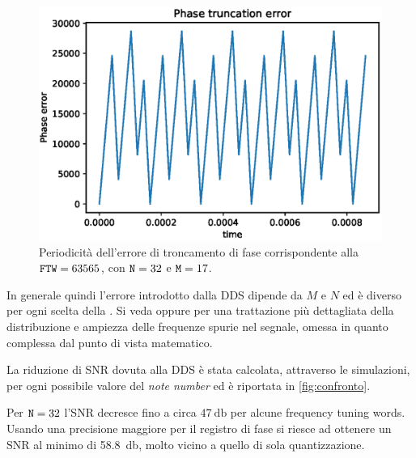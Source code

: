 \begin{figure}[H]
	\centering
	\includegraphics[width=0.85\columnwidth]{TeX_files/phase_truncation_error.eps}
	\caption{Periodicità dell'errore di troncamento di fase corrispondente alla $\texttt{FTW}=63565$, con $\texttt{N}=32$ e $\texttt{M}=17$.}
\end{figure}

In generale quindi l'errore introdotto dalla DDS dipende da $M$ e $N$ ed è diverso per ogni
scelta della . Si veda \cite{} oppure \cite{} per una trattazione
più dettagliata della distribuzione e ampiezza delle frequenze spurie nel segnale,
omessa in quanto complessa dal punto di vista matematico.

La riduzione di SNR dovuta alla DDS è stata calcolata, attraverso le simulazioni,
per ogni possibile valore del \textit{note number} ed è riportata in \cref{fig:confronto}.

Per $\texttt{N}=32$ l'SNR decresce fino a circa $\SI{47}{\decibel}$ per alcune
frequency tuning words. Usando una precisione maggiore per il registro di fase
si riesce ad ottenere un SNR al minimo di \SI{58.8}{\decibel}, molto vicino a quello di sola quantizzazione.


